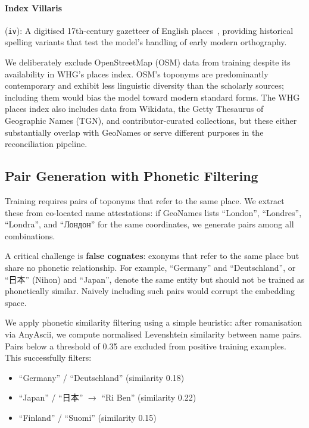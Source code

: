 \documentclass[11pt,a4paper]{article}
\begin{document}
\paragraph{Index Villaris} (\texttt{iv}): A digitised 17th-century gazetteer of English places~\citep{indexvillaris2024}, providing historical spelling variants that test the model's handling of early modern orthography.

We deliberately exclude OpenStreetMap (OSM) data from training despite its availability in WHG's places index. OSM's toponyms are predominantly contemporary and exhibit less linguistic diversity than the scholarly sources; including them would bias the model toward modern standard forms. The WHG places index also includes data from Wikidata, the Getty Thesaurus of Geographic Names (TGN), and contributor-curated collections, but these either substantially overlap with GeoNames or serve different purposes in the reconciliation pipeline.

\subsection{Pair Generation with Phonetic Filtering}

Training requires pairs of toponyms that refer to the same place. We extract these from co-located name attestations: if GeoNames lists ``London'', ``Londres'', ``Londra'', and ``Лондон'' for the same coordinates, we generate pairs among all combinations.

A critical challenge is \textbf{false cognates}: exonyms that refer to the same place but share no phonetic relationship. For example, ``Germany'' and ``Deutschland'', or ``日本'' (Nihon) and ``Japan'', denote the same entity but should not be trained as phonetically similar. Naively including such pairs would corrupt the embedding space.

We apply phonetic similarity filtering using a simple heuristic: after romanisation via AnyAscii, we compute normalised Levenshtein similarity between name pairs. Pairs below a threshold of 0.35 are excluded from positive training examples. This successfully filters:

\begin{itemize}
    \item ``Germany'' / ``Deutschland'' (similarity 0.18)
    \item ``Japan'' / ``日本'' $\rightarrow$ ``Ri Ben'' (similarity 0.22)
    \item ``Finland'' / ``Suomi'' (similarity 0.15)
\end{itemize}
\end{document}

